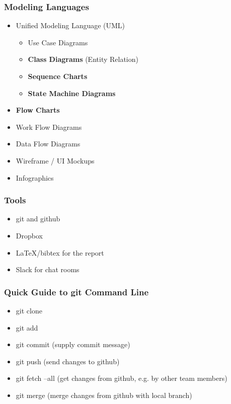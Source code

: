 \documentclass[hyperref={pdfpagelabels=false,linkcolor=blue}, aspectratio=1610]{beamer}
\begin{document}
\begin{frame}
\frametitle{Modeling Languages}
\begin{block}{}
 \begin{itemize}
  \item Unified Modeling Language (UML)
  \begin{itemize}
	\item Use Case Diagrams
  	\item \textbf{Class Diagrams} (Entity Relation)
	\item \textbf{Sequence Charts}
	\item \textbf{State Machine Diagrams}
  \end{itemize}
  \item \textbf{Flow Charts}
  \item Work Flow Diagrams
  \item Data Flow Diagrams
  \item Wireframe / UI Mockups
  \item Infographics
 \end{itemize}
\end{block}
\end{frame}

\begin{frame}
\frametitle{Tools}
\begin{block}{}
 \begin{itemize}
  \item git and github
  \item Dropbox
  \item LaTeX/bibtex for the report
  \item Slack for chat rooms
 \end{itemize}
\end{block}
\end{frame}

\begin{frame}
\frametitle{Quick Guide to git Command Line}
\begin{block}{}
 \begin{itemize}
  \item git clone 
  \item git add 
  \item git commit \quad (supply commit message)
  \item git push \quad (send changes to github)
  \item git fetch --all \quad (get changes from github, e.g. by other team members)
  \item git merge \quad (merge changes from github with local branch)
 \end{itemize}
\end{block}
\end{frame}
\end{document}
